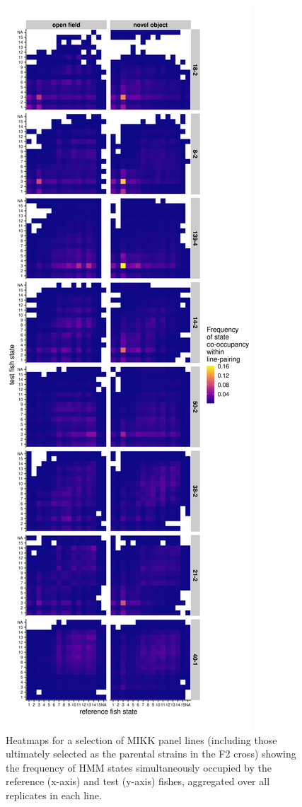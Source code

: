 \documentclass[
]{article}
\begin{document}
\begin{figure}
\includegraphics[width=1\linewidth]{figs/mikk_behaviour/0.08_15_cooc_heatmap} \caption{Heatmaps for a selection of MIKK panel lines (including those ultimately selected as the parental strains in the F2 cross) showing the frequency of HMM states simultaneously occupied by the reference (x-axis) and test (y-axis) fishes, aggregated over all replicates in each line.}\label{fig:F0-sge-cooc-heat}
\end{figure}
\end{document}
